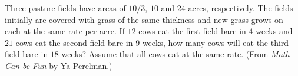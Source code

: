 Three pasture fields have areas of $10/3$, $10$ and $24$ acres, respectively.
The fields initially are covered with grass of the same thickness and new grass
grows on each at the same rate per acre. If $12$ cows eat the first field bare
in $4$ weeks and $21$ cows eat the second field bare in $9$ weeks, how many
cows will eat the third field bare in $18$ weeks? Assume that all cows eat at
the same rate. (From {\it Math Can be Fun} by Ya Perelman.)
